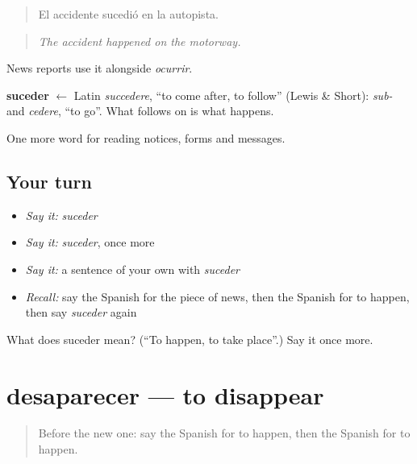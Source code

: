 \begin{quote}
El accidente sucedió en la autopista.
\end{quote}

\begin{quote}
\emph{The accident happened on the motorway.}
\end{quote}

News reports use it alongside \emph{ocurrir}.

\begin{cousinweb}
\textbf{suceder} $\leftarrow$ Latin \emph{succedere}, \textquotedblleft{}to come after, to follow\textquotedblright{} (Lewis \& Short): \emph{sub-} and \emph{cedere}, \textquotedblleft{}to go\textquotedblright{}. What follows on is what happens.
\end{cousinweb}

\begin{grammarlens}[title={What you've built}]
One more word for reading notices, forms and messages.
\end{grammarlens}

\subsection*{Your turn}
\begin{itemize}
\raggedright
  \item \emph{Say it:} \emph{suceder}
  \item \emph{Say it:} \emph{suceder}, once more
  \item \emph{Say it:} a sentence of your own with \emph{suceder}
  \item \emph{Recall:} say the Spanish for the piece of news, then the Spanish for to happen, then say \emph{suceder} again
\end{itemize}

\begin{tcolorbox}[breakable,colback=teal!4,colframe=teal!35!black,title={Before you move on}]
What does suceder mean? (\textquotedblleft{}To happen, to take place\textquotedblright{}.) Say it once more.
\end{tcolorbox}
\section[desaparecer]{desaparecer — to disappear}

\label{lesson:ES-C495-desaparecer}



\begin{quote}
Before the new one: say the Spanish for to happen, then the Spanish for to happen.
\end{quote}

